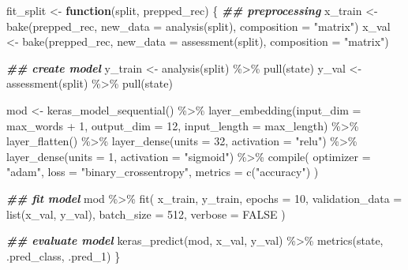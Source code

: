 \documentclass[
]{krantz}
\makeatletter
\newenvironment{Shaded}{\begin{snugshade}}{\end{snugshade}}
\newcommand{\AttributeTok}[1]{\textcolor[rgb]{0.77,0.63,0.00}{#1}}
\newcommand{\ConstantTok}[1]{\textcolor[rgb]{0.00,0.00,0.00}{#1}}
\newcommand{\ControlFlowTok}[1]{\textcolor[rgb]{0.13,0.29,0.53}{\textbf{#1}}}
\newcommand{\DecValTok}[1]{\textcolor[rgb]{0.00,0.00,0.81}{#1}}
\newcommand{\DocumentationTok}[1]{\textcolor[rgb]{0.56,0.35,0.01}{\textbf{\textit{#1}}}}
\newcommand{\FunctionTok}[1]{\textcolor[rgb]{0.00,0.00,0.00}{#1}}
\newcommand{\NormalTok}[1]{#1}
\newcommand{\OtherTok}[1]{\textcolor[rgb]{0.56,0.35,0.01}{#1}}
\newcommand{\SpecialCharTok}[1]{\textcolor[rgb]{0.00,0.00,0.00}{#1}}
\newcommand{\StringTok}[1]{\textcolor[rgb]{0.31,0.60,0.02}{#1}}
\newenvironment{kframe}{%
\medskip{}
\setlength{\fboxsep}{.8em}
 \def\at@end@of@kframe{}%
 \ifinner\ifhmode%
  \def\at@end@of@kframe{\end{minipage}}%
  \begin{minipage}{\columnwidth}%
 \fi\fi%
 \def\FrameCommand##1{\hskip\@totalleftmargin \hskip-\fboxsep
 \colorbox{shadecolor}{##1}\hskip-\fboxsep
     \hskip-\linewidth \hskip-\@totalleftmargin \hskip\columnwidth}%
 \MakeFramed {\advance\hsize-\width
   \@totalleftmargin\z@ \linewidth\hsize
   \@setminipage}}%
 {\par\unskip\endMakeFramed%
 \at@end@of@kframe}
\renewenvironment{Shaded}{\begin{kframe}}{\end{kframe}}
\makeatother
\begin{document}
\begin{Shaded}
\begin{Highlighting}[]
\NormalTok{fit\_split }\OtherTok{\textless{}{-}} \ControlFlowTok{function}\NormalTok{(split, prepped\_rec) \{}
  \DocumentationTok{\#\# preprocessing}
\NormalTok{  x\_train }\OtherTok{\textless{}{-}} \FunctionTok{bake}\NormalTok{(prepped\_rec, }\AttributeTok{new\_data =} \FunctionTok{analysis}\NormalTok{(split),}
                  \AttributeTok{composition =} \StringTok{"matrix"}\NormalTok{)}
\NormalTok{  x\_val   }\OtherTok{\textless{}{-}} \FunctionTok{bake}\NormalTok{(prepped\_rec, }\AttributeTok{new\_data =} \FunctionTok{assessment}\NormalTok{(split),}
                  \AttributeTok{composition =} \StringTok{"matrix"}\NormalTok{)}

  \DocumentationTok{\#\# create model}
\NormalTok{  y\_train }\OtherTok{\textless{}{-}} \FunctionTok{analysis}\NormalTok{(split) }\SpecialCharTok{\%\textgreater{}\%} \FunctionTok{pull}\NormalTok{(state)}
\NormalTok{  y\_val   }\OtherTok{\textless{}{-}} \FunctionTok{assessment}\NormalTok{(split) }\SpecialCharTok{\%\textgreater{}\%} \FunctionTok{pull}\NormalTok{(state)}

\NormalTok{  mod }\OtherTok{\textless{}{-}} \FunctionTok{keras\_model\_sequential}\NormalTok{() }\SpecialCharTok{\%\textgreater{}\%}
    \FunctionTok{layer\_embedding}\NormalTok{(}\AttributeTok{input\_dim =}\NormalTok{ max\_words }\SpecialCharTok{+} \DecValTok{1}\NormalTok{,}
                    \AttributeTok{output\_dim =} \DecValTok{12}\NormalTok{,}
                    \AttributeTok{input\_length =}\NormalTok{ max\_length) }\SpecialCharTok{\%\textgreater{}\%}
    \FunctionTok{layer\_flatten}\NormalTok{() }\SpecialCharTok{\%\textgreater{}\%}
    \FunctionTok{layer\_dense}\NormalTok{(}\AttributeTok{units =} \DecValTok{32}\NormalTok{, }\AttributeTok{activation =} \StringTok{"relu"}\NormalTok{) }\SpecialCharTok{\%\textgreater{}\%}
    \FunctionTok{layer\_dense}\NormalTok{(}\AttributeTok{units =} \DecValTok{1}\NormalTok{, }\AttributeTok{activation =} \StringTok{"sigmoid"}\NormalTok{) }\SpecialCharTok{\%\textgreater{}\%} \FunctionTok{compile}\NormalTok{(}
      \AttributeTok{optimizer =} \StringTok{"adam"}\NormalTok{,}
      \AttributeTok{loss =} \StringTok{"binary\_crossentropy"}\NormalTok{,}
      \AttributeTok{metrics =} \FunctionTok{c}\NormalTok{(}\StringTok{"accuracy"}\NormalTok{)}
\NormalTok{    )}

  \DocumentationTok{\#\# fit model}
\NormalTok{  mod }\SpecialCharTok{\%\textgreater{}\%}
    \FunctionTok{fit}\NormalTok{(}
\NormalTok{      x\_train,}
\NormalTok{      y\_train,}
      \AttributeTok{epochs =} \DecValTok{10}\NormalTok{,}
      \AttributeTok{validation\_data =} \FunctionTok{list}\NormalTok{(x\_val, y\_val),}
      \AttributeTok{batch\_size =} \DecValTok{512}\NormalTok{,}
      \AttributeTok{verbose =} \ConstantTok{FALSE}
\NormalTok{    )}

  \DocumentationTok{\#\# evaluate model}
  \FunctionTok{keras\_predict}\NormalTok{(mod, x\_val, y\_val) }\SpecialCharTok{\%\textgreater{}\%}
    \FunctionTok{metrics}\NormalTok{(state, .pred\_class, .pred\_1)}
\NormalTok{\}}
\end{Highlighting}
\end{Shaded}
\end{document}
